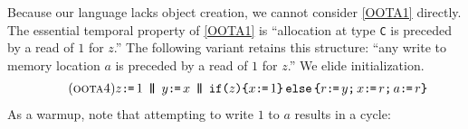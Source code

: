 \begin{example}
  \label{ex:lochb}
  Because our language lacks object creation, we cannot consider \ref{OOTA1}
  directly.  The essential temporal property of \ref{OOTA1} is ``allocation
  at type \texttt{C} is preceded by a read of $1$ for $z$.''  The following
  variant retains this structure: ``any write to memory location $a$ is
  preceded by a read of $1$ for $z$.''  We elide initialization.
\begin{align*}
  \tag{\textsc{oota4}}\label{OOTA4}
  z\GETS1
  \PAR
    y\GETS x
  \PAR
    \IF{z}\THEN x\GETS1 \ELSE r\GETS y \SEMI x\GETS r \SEMI a\GETS r \FI
  \end{align*}
  As a warmup, note that attempting to write $1$ to $a$ results
  in a cycle:
\begin{tikzdisplay}[node distance=1.5em]
\end{tikzdisplay}


\end{example}

